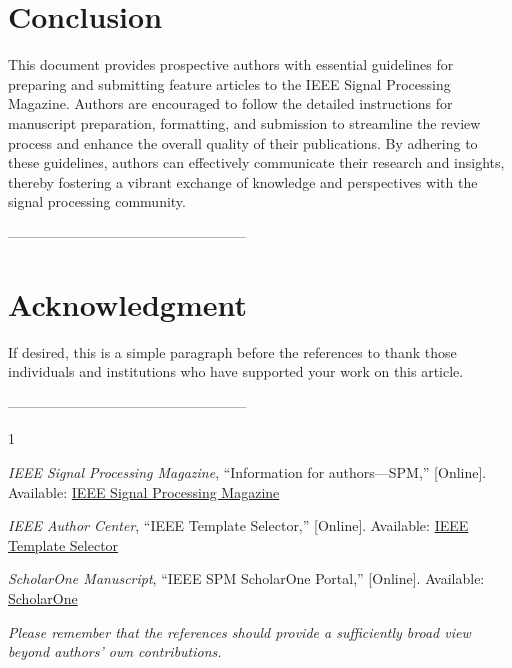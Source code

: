 \documentclass[11pt,draftcls,onecolumn,journal]{IEEEtran}
\begin{document}
\section*{Conclusion}
This document provides prospective authors with essential guidelines for preparing and submitting feature articles to the IEEE Signal Processing Magazine. Authors are encouraged to follow the detailed instructions for manuscript preparation, formatting, and submission to streamline the review process and enhance the overall quality of their publications. By adhering to these guidelines, authors can effectively communicate their research and insights, thereby fostering a vibrant exchange of knowledge and perspectives with the signal processing community.

---------------------------------------------------
%
\section*{Acknowledgment}
If desired, this is a simple paragraph before the references to thank those individuals and institutions who have supported your work on this article. 



---------------------------------------------------
%
\begin{thebibliography}{1}


{\it{IEEE Signal Processing Magazine}}, ``Information for authors—SPM,'' [Online]. Available: \href{https://signalprocessingsociety.org/publications-resources/ieee-signal-processing-magazine/information-authors-spm}{IEEE Signal Processing Magazine}

{\it{IEEE Author Center}}, ``IEEE Template Selector,'' [Online]. Available: \href{https://template-selector.ieee.org/secure/templateSelector/publicationType}{IEEE Template Selector}

{\it{ScholarOne Manuscript}}, ``IEEE SPM ScholarOne Portal,'' [Online]. Available: \href{https://mc.manuscriptcentral.com/sps-ieee}{ScholarOne}

{\em Please remember that the references should provide a sufficiently broad view beyond authors' own contributions.} 

\end{thebibliography}
%
%
%
%
%
\end{document}
